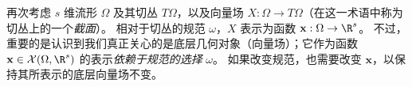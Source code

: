




再次考虑 $s$ 维流形 $\Omega$ 及其切丛 $T\Omega$，以及向量场
$X : \Omega \rightarrow T \Omega$（在这一术语中称为切丛上的一个{\em 截面}）。
%
相对于切丛的规范 $\omega$，$X$ 表示为函数 $\mathbf{x} : \Omega \rightarrow \R^s$。
不过，重要的是认识到我们真正关心的是底层几何对象（向量场）；它作为函数 $\mathbf{x} \in \mathcal{X}(\Omega,\R^s)$ 的表示{\em 依赖于规范的选择} $\omega$。
%
如果改变规范，也需要改变 $\mathbf{x}$，以保持其所表示的底层向量场不变。




%


